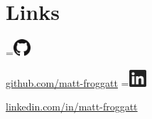 \documentclass[]{deedy-resume-openfont}
\newcommand*{\vcenteredhbox}[1]{\begingroup
\setbox0=\hbox{#1}\parbox{\wd0}{\box0}\endgroup}
\begin{document}
\begin{minipage}[t]{0.95\textwidth}
\section{Links}
\hspace{10pt}
\vcenteredhbox{\includegraphics[height = 18pt]{Icons/GitHub-Mark-64px.png}}        \space\href{https://github.com/matt-froggatt}{github.com/matt-froggatt}
\hspace{5pt}
\vcenteredhbox{\includegraphics[height = 18pt]{Icons/black-white-linkedin.jpg}} \space\href{https://www.linkedin.com/in/matt-froggatt/}{linkedin.com/in/matt-froggatt}    

\end{minipage}
\end{document}
